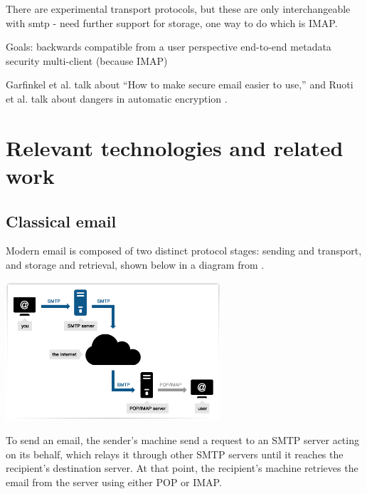 \documentclass[pageno]{jpaper}
\begin{document}
There are experimental transport protocols, but these are only interchangeable with smtp - need further support for storage, one way to do which is IMAP.


Goals:
backwards compatible from a user perspective
end-to-end metadata security
multi-client (because IMAP)

Garfinkel et al. \cite{garfinkel} talk about ``How to make secure email easier to use,'' and Ruoti et al. talk about dangers in automatic encryption \cite{ruoti}.

\section{Relevant technologies and related work}

\subsection{Classical email}
Modern email is composed of two distinct protocol stages: sending and transport, and storage and retrieval, shown below in a diagram from \cite{smtp_imap}.

\begin{center}
\includegraphics[width=0.6\textwidth]{smtp_imap}
\end{center}

To send an email, the sender's machine send a request to an SMTP server acting on its behalf, which relays it through other SMTP servers until it reaches the recipient's destination server. At that point, the recipient's machine retrieves the email from the server using either POP or IMAP.
\end{document}

